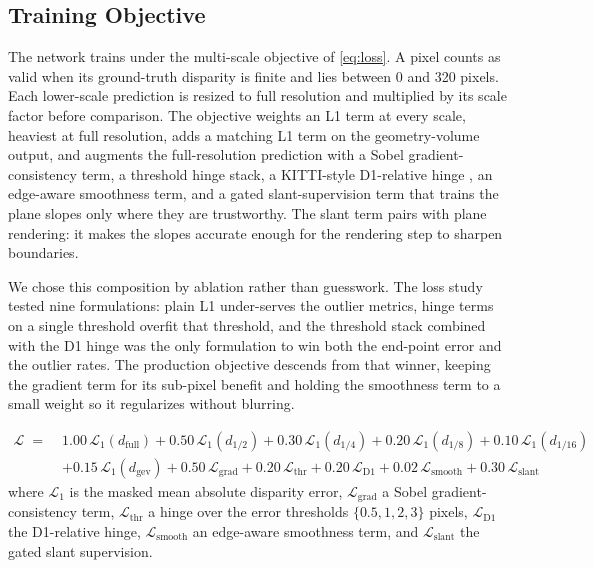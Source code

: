 \subsection{Training Objective}
The network trains under the multi-scale objective of \eqref{eq:loss}. A
pixel counts as valid when its ground-truth disparity is finite and lies
between 0 and 320 pixels. Each lower-scale prediction is resized to full
resolution and multiplied by its scale factor before comparison. The
objective weights an L1 term at every scale, heaviest at full
resolution, adds a matching L1 term on the geometry-volume output, and
augments the full-resolution prediction with a Sobel
gradient-consistency term, a threshold hinge stack, a KITTI-style
D1-relative hinge \cite{menze2015kitti}, an edge-aware smoothness term, and a gated
slant-supervision term that trains the plane slopes only where they are
trustworthy. The slant term pairs with plane rendering: it makes the
slopes accurate enough for the rendering step to sharpen boundaries.

We chose this composition by ablation rather than guesswork. The loss
study tested nine formulations: plain L1
under-serves the outlier metrics, hinge terms on a single threshold
overfit that threshold, and the threshold stack combined with the D1
hinge was the only formulation to win both the end-point error and the
outlier rates. The production objective descends from that winner,
keeping the gradient term for its sub-pixel benefit and holding the
smoothness term to a small weight so it regularizes without blurring.

\begin{equation}
\begin{aligned}
\mathcal{L} \;=\;& 1.00\,\mathcal{L}_{1}(d_{\mathrm{full}})
 + 0.50\,\mathcal{L}_{1}(d_{1/2})
 + 0.30\,\mathcal{L}_{1}(d_{1/4})
 + 0.20\,\mathcal{L}_{1}(d_{1/8})
 + 0.10\,\mathcal{L}_{1}(d_{1/16})\\
&+ 0.15\,\mathcal{L}_{1}(d_{\mathrm{gev}})
 + 0.50\,\mathcal{L}_{\mathrm{grad}}
 + 0.20\,\mathcal{L}_{\mathrm{thr}}
 + 0.20\,\mathcal{L}_{\mathrm{D1}}
 + 0.02\,\mathcal{L}_{\mathrm{smooth}}
 + 0.30\,\mathcal{L}_{\mathrm{slant}}
\end{aligned}
\label{eq:loss}
\end{equation}
where $\mathcal{L}_1$ is the masked mean absolute disparity error,
$\mathcal{L}_{\mathrm{grad}}$ a Sobel gradient-consistency term,
$\mathcal{L}_{\mathrm{thr}}$ a hinge over the error thresholds
$\{0.5, 1, 2, 3\}$ pixels, $\mathcal{L}_{\mathrm{D1}}$ the D1-relative
hinge, $\mathcal{L}_{\mathrm{smooth}}$ an edge-aware smoothness term, and
$\mathcal{L}_{\mathrm{slant}}$ the gated slant supervision.

